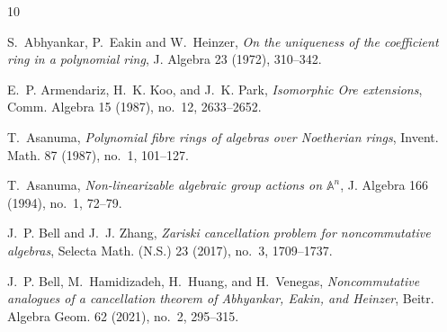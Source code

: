 \documentclass{amsart}
\theoremstyle{plain}
\numberwithin{theorem}{section}
\numberwithin{equation}{theorem}
\theoremstyle{definition}
\begin{document}







\providecommand{\bysame}{\leavevmode\hbox to3em{\hrulefill}\thinspace}
\providecommand{\MR}{\relax\ifhmode\unskip\space\fi MR }
\providecommand{\MRhref}[2]{%

\href{http://www.ams.org/mathscinet-getitem?mr=#1}{#2} }
\providecommand{\href}[2]{#2}


\begin{thebibliography}{10}

S.~Abhyankar, P.~Eakin and W.~Heinzer,
\emph{On the uniqueness of the coefficient ring in a polynomial ring},
J. Algebra 23 (1972), 310--342.

E.~P. Armendariz, H.~K. Koo, and J.~K. Park,
\emph{Isomorphic Ore extensions},
Comm. Algebra 15 (1987), no.~12, 2633--2652.

T.~Asanuma,
\emph{Polynomial fibre rings of algebras over Noetherian rings},
Invent. Math. 87 (1987), no.~1, 101--127.

T.~Asanuma,
\emph{Non-linearizable algebraic group actions on $\mathbb{A}^n$},
J. Algebra 166 (1994), no.~1, 72--79.



J.~P. Bell and J.~J. Zhang,
\emph{Zariski cancellation problem for noncommutative algebras},
Selecta Math. (N.S.) 23 (2017), no.~3, 1709--1737.


J.~P. Bell, M.~Hamidizadeh, H.~Huang, and H.~Venegas,
\emph{Noncommutative analogues of a cancellation theorem of Abhyankar, Eakin, and Heinzer},
Beitr. Algebra Geom. 62 (2021), no.~2, 295--315.


\end{thebibliography}
\end{document}
